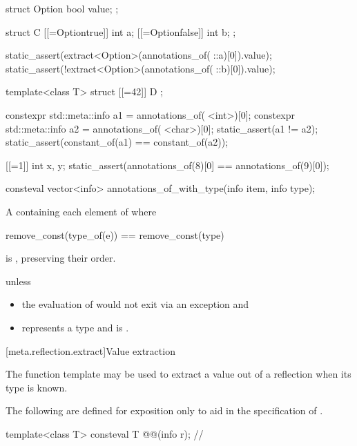 \begin{itemdescr}
\begin{example}
\begin{codeblock}
struct Option { bool value; };

struct C {
  [[=Option{true}]] int a;
  [[=Option{false}]] int b;
};

static_assert(extract<Option>(annotations_of(^^C::a)[0]).value);
static_assert(!extract<Option>(annotations_of(^^C::b)[0]).value);

template<class T>
  struct [[=42]] D { };

constexpr std::meta::info a1 = annotations_of(^^D<int>)[0];
constexpr std::meta::info a2 = annotations_of(^^D<char>)[0];
static_assert(a1 != a2);
static_assert(constant_of(a1) == constant_of(a2));

[[=1]] int x, y;
static_assert(annotations_of(^^x)[0] == annotations_of(^^y)[0]);
\end{codeblock}
\end{example}
\end{itemdescr}

%
\begin{itemdecl}
consteval vector<info> annotations_of_with_type(info item, info type);
\end{itemdecl}

\begin{itemdescr}
\pnum
\returns
A  containing each element  of 
where
\begin{codeblock}
remove_const(type_of(e)) == remove_const(type)
\end{codeblock}
is , preserving their order.

\pnum
\throws
{} unless
\begin{itemize}
\item
  the evaluation of
   would not exit via an exception and
\item
   represents a type and
   is .
\end{itemize}
\end{itemdescr}

[meta.reflection.extract]{Value extraction}

\pnum
The  function template may be used
to extract a value out of a reflection when its type is known.

\pnum
The following are defined for exposition only
to aid in the specification of .

\begin{itemdecl}
template<class T>
  consteval T @@(info r);      // \expos
\end{itemdecl}


